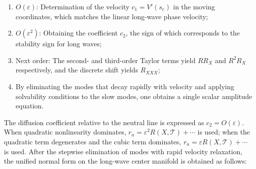 \documentclass[11pt,a4paper,openany]{book}
\numberwithin{equation}{chapter}
\numberwithin{figure}{chapter}
\numberwithin{table}{chapter}
\begin{document}
\begin{enumerate}[leftmargin=1.6em,itemsep=3pt]
\item






$O(\varepsilon)$: Determination of the velocity $c_1=V'(s_e)$ in the moving coordinates, which matches the linear long-wave phase velocity;









\item






$O(\varepsilon^2)$: Obtaining the coefficient $c_2$, the sign of which corresponds to the stability sign for long waves;




\item

Next order: The second- and third-order Taylor terms yield $RR_X$ and $R^2R_X$ respectively, and the discrete shift yields $R_{XXX}$;









\item






By eliminating the modes that decay rapidly with velocity and applying solvability conditions to the slow modes, one obtains a single scalar amplitude equation. \end{enumerate}












The diffusion coefficient relative to the neutral line is expressed as $c_2=O(\varepsilon)$. When quadratic nonlinearity dominates, $r_n=\varepsilon^2R(X,\mathcal T)+\cdots$ is used; when the quadratic term degenerates and the cubic term dominates, $r_n=\varepsilon R(X,\mathcal T)+\cdots$ is used. After the stepwise elimination of modes with rapid velocity relaxation, the unified normal form on the long-wave center manifold is obtained as follows:
\end{document}

